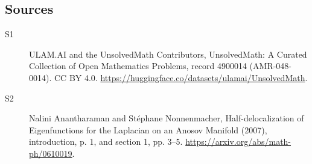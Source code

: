 \documentclass[11pt]{article}
\begin{document}
\subsection{Sources}
\begin{description}
\item[\hypertarget{source:4900014:1}{S1}] ULAM.AI and the UnsolvedMath Contributors, UnsolvedMath: A Curated Collection of Open Mathematics Problems, record 4900014 (AMR-048-0014). CC BY 4.0. \url{https://huggingface.co/datasets/ulamai/UnsolvedMath}.
\item[\hypertarget{source:4900014:2}{S2}] Nalini Anantharaman and Stéphane Nonnenmacher, Half-delocalization of Eigenfunctions for the Laplacian on an Anosov Manifold (2007), introduction, p. 1, and section 1, pp. 3--5. \url{https://arxiv.org/abs/math-ph/0610019}.
\end{description}
\label{end:4900014}
\end{document}
